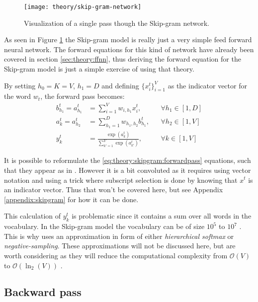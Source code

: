\begin{figure}[H]
	\centering
	\texttt{[image: theory/skip-gram-network]}
	\caption{Visualization of a single pass though the Skip-gram network.}
	\label{fig:theory:skipgram:network}
\end{figure}

As seen in Figure \ref{fig:theory:skipgram:network} the Skip-gram model is really just a very simple feed forward neural network. The forward equations for this kind of network have already been covered in section \ref{sec:theory:ffnn}, thus deriving the forward equation for the Skip-gram model is just a simple exercise of using that theory. 

By setting $h_0 = K = V$, $h_1 = D$ and defining $\{x^t_i\}_{i=1}^V$ as the indicator vector for the word $w_t$, the forward pass becomes:
\begin{equation}
\begin{aligned}
b_{h_1}^t = a_{h_1}^t &= \sum_{i = 1}^V w_{i, h_1} x_i^t, && \forall h_1 \in [1, D] \\
a_{k}^t = a_{h_2}^t &= \sum_{h_1 = 1}^{D} w_{h_1, h_2} b_{h_1}^t, && \forall h_2 \in [1, V] \\
y_k^t &= \frac{\exp(a_k^t)}{\sum_{k'=1}^V \exp(a_{k'}^t)}, && \forall k \in [1, V]
\end{aligned}
\label{eq:theory:skipgram:forwardpass}
\end{equation}

It is possible to reformulate the \eqref{eq:theory:skipgram:forwardpass} equations, such that they appear as in \cite{word2vec-details}. However it is a bit convoluted as it requires using vector notation and using a trick where subscript selection is done by knowing that $x^t$ is an indicator vector. Thus that won't be covered here, but see Appendix \ref{appendix:skipgram} for how it can be done.

This calculation of $y_k^t$ is problematic since it contains a sum over all words in the vocabulary. In the Skip-gram model the vocabulary can be of size $10^5$ to $10^7$ \cite{word2vec-details}. This is why \cite{word2vec-comparing, word2vec-details, word2vec-explained} uses an approximation in form of either \textit{hierarchical softmax} or \textit{negative-sampling}. These approximations will not be discussed here, but are worth considering as they will reduce the computational complexity from $\mathcal{O}(V)$ to $\mathcal{O}(\ln_2(V))$ \cite{word2vec-comparing}.

\subsection{Backward pass}

